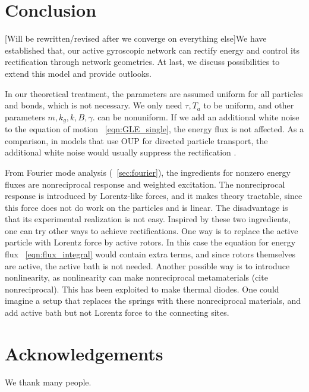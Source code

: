 \documentclass[
 preprint,
 preprintnumbers,
 amsmath,amssymb,
 aps,
 pre,
 longbibliography,
 superscriptaddress,
 10pt, twocolumn
]{revtex4-1}
\begin{document}
\section{Conclusion} \label{sec:conclusion}

[Will be rewritten/revised after we converge on everything else]We have established that, our active gyroscopic network can rectify energy and control its rectification through network geometries.
At last, we discuss possibilities to extend this model and provide outlooks.

In our theoretical treatment, the parameters are assumed uniform for all particles and bonds, which is not necessary. We only need $\tau,T_a$ to be uniform, and other parameters $m, k_g, k, B, \gamma$. can be nonuniform.
If we add an additional white noise to the equation of motion \eqnname~\eqref{eqn:GLE_single}, the energy flux is not affected. As a comparison, in models that use OUP for directed particle transport, the additional white noise would usually suppress the rectification \cite{Bartussek1996PreciseNumerics}.

From Fourier mode analysis (\secname~\ref{sec:fourier}), the ingredients for nonzero energy fluxes are nonreciprocal response and weighted excitation.
The nonreciprocal response is introduced by Lorentz-like forces, and it makes theory tractable, since this force does not do work on the particles and is linear. The disadvantage is that its experimental realization is not easy.
Inspired by these two ingredients, one can try other ways to achieve rectifications.
One way is to replace the active particle with Lorentz force by active rotors. In this case the equation for energy flux \eqnname~\eqref{eqn:flux_integral} would contain extra terms, and since rotors themselves are active, the active bath is not needed.
Another possible way is to introduce nonlinearity, as nonlinearity can make nonreciprocal metamaterials  (cite nonreciprocal). This has been exploited to make thermal diodes. One could imagine a setup that replaces the springs with these nonreciprocal materials, and add active bath but not Lorentz force to the connecting sites.



\section*{Acknowledgements}
We thank many people.



\end{document}
